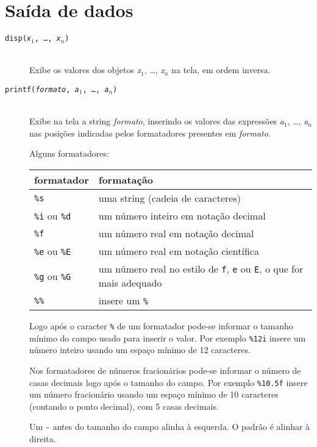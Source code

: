 \documentclass[11pt,fleqn]{practice}
\begin{document}
\section{Saída de dados}

\begin{description}
  \item [\texttt{disp(\textsl{x$_1$}, \ldots, \textsl{x$_n$})}]\mbox{}\\
  Exibe os valores dos objetos \textsl{x$_1$}, \ldots, \textsl{x$_n$} na
  tela, em ordem inversa.

  \item [\texttt{printf(\textsl{formato}, \textsl{a$_1$}, \ldots, \textsl{a$_n$})}]\mbox{}\\
  Exibe na tela a string \textsl{formato}, inserindo os valores das expressões
  \textsl{a$_1$}, \ldots, \textsl{a$_n$} nas posições indicadas pelos
  formatadores presentes em \textsl{formato}.

  Alguns formatadores:
  \begin{center}
    \begin{tabular}{ll}\hline
      \textbf{formatador} & \textbf{formatação} \\\hline
      \texttt{\%s} & uma string (cadeia de caracteres) \\\hline
      \texttt{\%i} ou \texttt{\%d} & um número inteiro em notação decimal \\\hline
      \texttt{\%f} & um número real em notação decimal \\\hline
      \texttt{\%e} ou \texttt{\%E} & um número real em notação científica \\\hline
      \texttt{\%g} ou \texttt{\%G} & um número real no estilo de \texttt{f}, \texttt{e} ou \texttt{E}, o que for mais adequado \\\hline
      \texttt{\%\%} & insere um \texttt{\%} \\\hline
    \end{tabular}
  \end{center}

  Logo após o caracter \texttt{\%} de um formatador pode-se informar o
  tamanho mínimo do campo usado para inserir o valor. Por exemplo
  \texttt{\%12i} insere um número inteiro usando um espaço mínimo de 12
  caracteres.

  Nos formatadores de números fracionários pode-se informar o número de
  casas decimais logo após o tamanho do campo. Por exemplo
  \texttt{\%10.5f} insere um número fracionário usando um espaço mínimo
  de 10 caracteres (contando o ponto decimal), com 5 casas decimais.

  Um \texttt{-} antes do tamanho do campo alinha à esquerda. O padrão é
  alinhar à direita.
\end{description}
\end{document}
